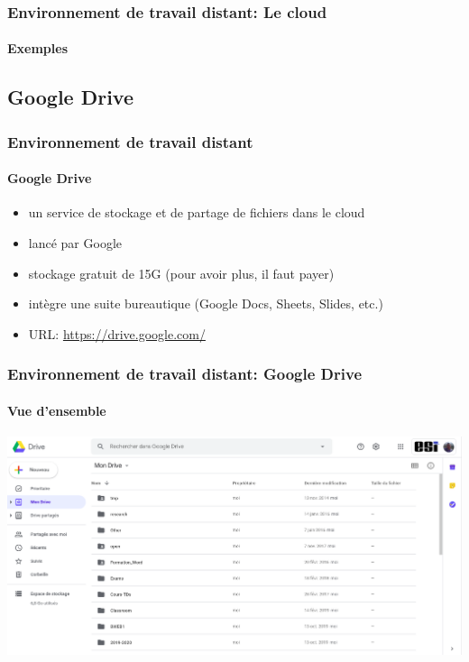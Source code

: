 \documentclass{beamer}
\begin{document}
\begin{frame}
\frametitle{Environnement de travail distant: Le cloud}
\framesubtitle{Exemples}



\end{frame}

\subsection{Google Drive}

\begin{frame}
\frametitle{Environnement de travail distant}
\framesubtitle{Google Drive}

\begin{itemize}
	\item un service de stockage et de partage de fichiers dans le cloud
	\item lancé par Google
	\item stockage gratuit de 15G (pour avoir plus, il faut payer)
	\item intègre une suite bureautique (Google Docs, Sheets, Slides, etc.)
	\item URL: \url{https://drive.google.com/}
\end{itemize}

\end{frame}


\begin{frame}
\frametitle{Environnement de travail distant: Google Drive}
\framesubtitle{Vue d'ensemble}

\begin{center}
	\includegraphics[width=
	\textwidth]{../img/Bweb01-environnement/drive.png}
\end{center}

\end{frame}
\end{document}

